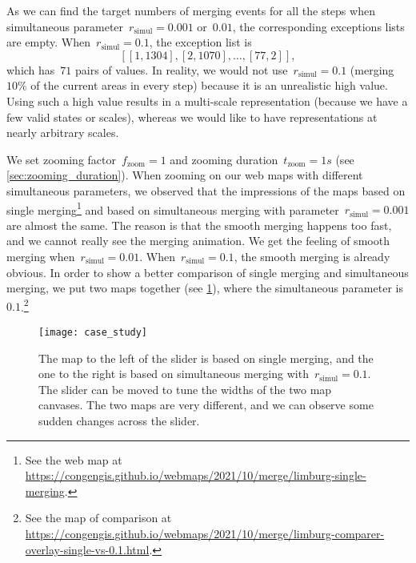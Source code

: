\documentclass[twocolumn]{svjour3}          %
\begin{document}
As we can find the target numbers of merging events for all the steps
when simultaneous parameter~$r_\mathrm{simul}= 0.001$ or~$0.01$, 
the corresponding exceptions lists are empty.
When~$r_\mathrm{simul}= 0.1$,
the exception list is
$$[[1, 1304], [2, 1070], \dots, [77, 2]],$$
which has~$71$ pairs of values.
In reality, we would not use~$r_\mathrm{simul}= 0.1$
(merging~$10\%$ of the current areas in every step)
because it is an unrealistic high value.
Using such a high value results in a multi-scale representation
(because we have a few valid states or scales),
whereas we would like to have representations at nearly
arbitrary scales.




We set zooming factor~$f_\mathrm{zoom}=1$ and 
zooming duration~$t_\mathrm{zoom}=1 s$ 
(see \sect\ref{sec:zooming_duration}).
When zooming on our web maps with different simultaneous parameters,
we observed that the impressions of the maps 
based on single merging\footnote{%
See the web map at
\url{https://congengis.github.io/webmaps/2021/10/merge/limburg-single-merging}.} 
and based on simultaneous merging with parameter~$r_\mathrm{simul}= 0.001$ 
are almost the same.
The reason is that the smooth merging happens too fast,
and we cannot really see the merging animation.
We get the feeling of smooth merging when~$r_\mathrm{simul}= 0.01$.
When~$r_\mathrm{simul}= 0.1$, the smooth merging is already obvious.
In order to show a better comparison of single merging 
and simultaneous merging,
we put two maps together (see \fig\ref{fig:comparison}),
where the simultaneous parameter is~$0.1$.\footnote{%
See the map of comparison at
\url{https://congengis.github.io/webmaps/2021/10/merge/limburg-comparer-overlay-single-vs-0.1.html}.}  


\begin{figure}[tb]
\centering
\texttt{[image: case\_study]}
\caption{
    The map to the left of the slider is based on single merging,
    and the one to the right is based on simultaneous merging
    with~$r_\mathrm{simul}= 0.1$.
    The slider can be moved to tune the widths of the two map canvases.
    The two maps are very different, and 
    we can observe some sudden changes across the slider.
}
\label{fig:comparison}
\end{figure}
\end{document}
